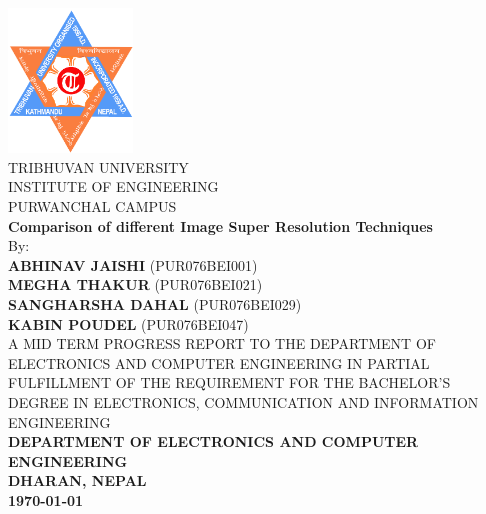 
\thispagestyle{empty} %



{
	\thispagestyle{empty}
	\centering
	\normalsize
	  
	\includegraphics[width=1.3in]{./figures/TUlogo.png}\\
	{TRIBHUVAN UNIVERSITY}\\
	{INSTITUTE OF ENGINEERING}\\
	PURWANCHAL CAMPUS
	\\[1.5cm]
	
	{\bf Comparison of different Image Super Resolution Techniques}\\[1cm]
	
	By:\\
	{\bf ABHINAV JAISHI} (PUR076BEI001)\\
	{\bf MEGHA THAKUR} (PUR076BEI021)\\
	{\bf SANGHARSHA DAHAL} (PUR076BEI029)\\
	{\bf KABIN POUDEL} (PUR076BEI047)\\[1.5cm]
	


	A MID TERM PROGRESS REPORT TO THE DEPARTMENT OF ELECTRONICS AND COMPUTER
	ENGINEERING IN PARTIAL FULFILLMENT OF THE REQUIREMENT FOR THE BACHELOR'S
	DEGREE IN ELECTRONICS, COMMUNICATION AND INFORMATION ENGINEERING\\[0.5cm]
	
	{\bf DEPARTMENT OF ELECTRONICS AND COMPUTER ENGINEERING\\
	DHARAN, NEPAL}\\[1.5cm]

	{\bf\today}
	
	
}

